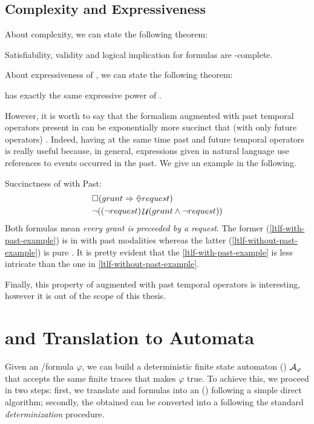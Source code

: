 \subsection{Complexity and Expressiveness}
About \PLTL complexity, we can state the following theorem:
\begin{theorem}
Satisfiability, validity and logical implication for \PLTL formulas are \PSPACE-complete.
\end{theorem}

\noindent About expressiveness of \PLTL, we can state the following theorem:
\begin{theorem}
\PLTL has exactly the same expressive power of \LTLf.
\end{theorem}

\noindent However, it is worth to say that the \LTLf formalism augmented with past temporal operators present in \PLTL can be exponentially more succinct that \LTLf (with only future operators) \citep{markey2003temporal}.
Indeed, having at the same time past and future temporal operators is really useful because, in general, expressions given in natural language use references to events occurred in the past. We give an example in the following.
\begin{example}\label{succinctness-example}
Succinctness of \LTLf with Past:
\begin{align}
&\Box(grant \Rightarrow \Once request)\label{ltlf-with-past-example}\\
&\lnot((\lnot request) \lUntil (grant \lAND \lnot request))\label{ltlf-without-past-example}
\end{align}
Both formulas mean \emph{every grant is preceeded by a request}. The  former (\ref{ltlf-with-past-example}) is in \LTLf with past modalities whereas the latter (\ref{ltlf-without-past-example}) is pure \LTLf. It is pretty evident that the \ref{ltlf-with-past-example} is less intricate than the one in \ref{ltlf-without-past-example}.
\end{example}
Finally, this property of \LTLf augmented with past temporal operators is interesting, however it is out of the scope of this thesis.
\section{\LTLf and \PLTL Translation to  Automata}\label{sec:formula-to-automa}
Given an \LTLf/\PLTL formula $\varphi$, we can build a deterministic finite state automaton (\DFA) \citep{Rabin:1959:FAD:1661907.1661909} 
$\mathcal{A}_\varphi$ that accepts the same finite traces that makes $\varphi$ true. To achieve this, we proceed in two steps: first, we translate \LTLf and \PLTL formulas into an (\NFA) \citep{DeGiacomo:2015:SLL:2832415.2832466} following a simple direct algorithm; secondly, the obtained \NFA can be converted into a \DFA following the standard \emph{determinization}  procedure.

